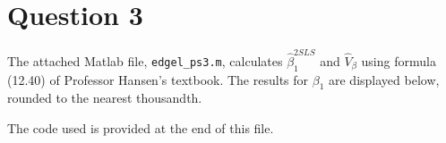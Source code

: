 \documentclass{article}
\newcommand{\bhat}{\hat{\beta}}
\begin{document}
\begin{enumerate}[(i)]
\end{enumerate}


\section*{Question 3}
The attached Matlab file, \texttt{edgel\_ps3.m}, calculates $\bhat^{2SLS}_1$ and $\hat{V}_\beta$ using formula (12.40) of Professor Hansen's textbook. The results for $\beta_1$ are displayed below, rounded to the nearest thousandth.
	
The code used is provided at the end of this file.

\pagebreak



\end{document}
